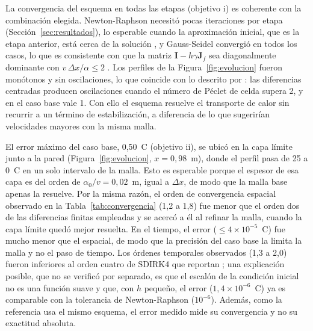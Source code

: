 \documentclass[final,5p,times,twocolumn,authoryear,11pt]{elsarticle}
\begin{document}
La convergencia del esquema en todas las etapas (objetivo i) es coherente con la combinación elegida. Newton-Raphson necesitó pocas iteraciones por etapa (Sección~\ref{sec:resultados}), lo esperable cuando la aproximación inicial, que es la etapa anterior, está cerca de la solución \citep{Deuflhard1974}, y Gauss-Seidel convergió en todos los casos, lo que es consistente con que la matriz $\mathbf{I}-h\gamma\mathbf{J}_f$ sea diagonalmente dominante con $v\,\Delta x/\alpha\le 2$ \citep{Zhang2015}. Los perfiles de la Figura~\ref{fig:evolucion} fueron monótonos y sin oscilaciones, lo que coincide con lo descrito por \citet{Gresho1981}: las diferencias centradas producen oscilaciones cuando el número de Péclet de celda supera 2, y en el caso base vale 1. Con ello el esquema resuelve el transporte de calor sin recurrir a un término de estabilización, a diferencia de lo que sugerirían velocidades mayores con la misma malla.

El error máximo del caso base, 0,50~\textdegree C (objetivo ii), se ubicó en la capa límite junto a la pared (Figura~\ref{fig:evolucion}, $x=0{,}98$~m), donde el perfil pasa de 25 a 0~\textdegree C en un solo intervalo de la malla. Esto es esperable porque el espesor de esa capa es del orden de $\alpha_0/v=0{,}02$~m, igual a $\Delta x$, de modo que la malla base apenas la resuelve. Por la misma razón, el orden de convergencia espacial observado en la Tabla~\ref{tab:convergencia} (1,2 a 1,8) fue menor que el orden dos de las diferencias finitas empleadas y se acercó a él al refinar la malla, cuando la capa límite quedó mejor resuelta. En el tiempo, el error ($\le 4\times10^{-5}$~\textdegree C) fue mucho menor que el espacial, de modo que la precisión del caso base la limita la malla y no el paso de tiempo. Los órdenes temporales observados (1,3 a 2,0) fueron inferiores al orden cuatro de SDIRK4 que reportan \citet{Deng2015}; una explicación posible, que no se verificó por separado, es que el escalón de la condición inicial no es una función suave y que, con $h$ pequeño, el error ($1{,}4\times10^{-6}$~\textdegree C) ya es comparable con la tolerancia de Newton-Raphson ($10^{-6}$). Además, como la referencia usa el mismo esquema, el error medido mide su convergencia y no su exactitud absoluta.
\end{document}

